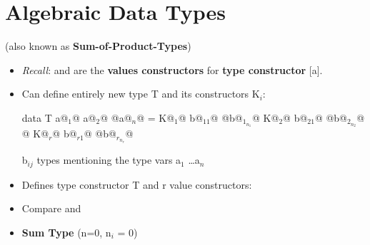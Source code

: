 

\section{Algebraic Data Types}

(also known as \textbf{Sum-of-Product-Types})

\begin{itemize}
  \item \textit{Recall}: \codeline{[]} and \codeline{(:)} are the \textbf{values constructors} for \textbf{type constructor} [a]. 
  \item Can define entirely new type T and its constructors K$_i$:\\
        \begin{Haskell}
data T a@$_1$@ a@$_2$@ @\dots@ a@$_n$@ = K@$_1$@ b@$_{11}$@ @\dots@ b@$_{1_{n_1}}$@
                     K@$_2$@ b@$_{21}$@ @\dots@ b@$_{2_{n_2}}$@
                     @\dots@
                     K@$_r$@ b@$_{r1}$@ @\dots@ b@$_{r_{n_r}}$@
        \end{Haskell}
        
        b$_{ij}$ types mentioning the type vars a$_1$ \dots a$_n$

  \item Defines type constructor T and r value constructors:\\
  \item Compare \codeline{[] :: [a]} and 
  \item \textbf{Sum Type} (n=0, n$_i$ = 0) \\


\end{itemize}
